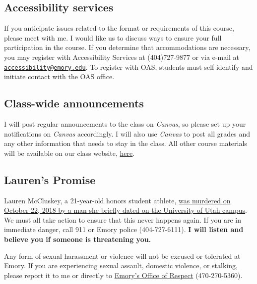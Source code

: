 \documentclass[11pt,]{article}
\begin{document}
\hypertarget{accessibility-services}{%
\subsection{Accessibility services}\label{accessibility-services}}

If you anticipate issues related to the format or requirements of this
course, please meet with me. I would like us to discuss ways to ensure
your full participation in the course. If you determine that
accommodations are necessary, you may register with Accessibility
Services at (404)727-9877 or via e-mail at
\href{mailto:accessibility@emory.edu}{\nolinkurl{accessibility@emory.edu}}.
To register with OAS, students must self identify and initiate contact
with the OAS office.

\hypertarget{class-wide-announcements}{%
\subsection{Class-wide announcements}\label{class-wide-announcements}}

I will post regular announcements to the class on \emph{Canvas}, so
please set up your notifications on \emph{Canvas} accordingly. I will
also use \emph{Canvas} to post all grades and any other information that
needs to stay in the class. All other course materials will be available
on our class website,
\href{https://econ372s22.classes.ianmccarthyecon.com/}{here}.

\hypertarget{laurens-promise}{%
\subsection{Lauren's Promise}\label{laurens-promise}}

Lauren McCluskey, a 21-year-old honors student athlete,
\href{https://www.sltrib.com/opinion/commentary/2019/02/10/commentary-failing-lauren/}{was
murdered on October 22, 2018 by a man she briefly dated on the
University of Utah campus}. We must all take action to ensure that this
never happens again. If you are in immediate danger, call 911 or Emory
police (404-727-6111). \textbf{I will listen and believe you if someone
is threatening you.}

Any form of sexual harassment or violence will not be excused or
tolerated at Emory. If you are experiencing sexual assault, domestic
violence, or stalking, please report it to me or directly to
\href{http://respect.emory.edu/index.html}{Emory's Office of Respect}
(470-270-5360).
\end{document}
